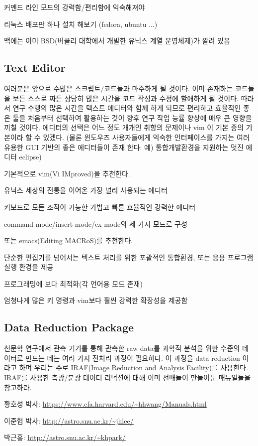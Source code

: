 \begin{packed_item}
\item 커멘드 라인 모드의 강력함/편리함에 익숙해져야
\item 리눅스 배포판 하나 설치 해보기 (fedora, ubuntu ...)
\item 맥에는 이미 BSD(버클리 대학에서 개발한 유닉스 계열 운영체제)가 깔려 있음
\end{packed_item}

\subsection{Text Editor}
여러분은 앞으로 수많은 스크립트/코드들과 마주하게 될 것이다. 이미 존재하는
코드들을 보든 스스로 짜든 상당히 많은 시간을 코드 작성과 수정에 할애하게 될
것이다. 따라서 연구 수행의 많은 시간을 텍스트 에디터와 함께 하게 되므로 편리하고
효율적인 좋은 툴을 처음부터 선택하여 활용하는 것이 향후 연구 작업 능률 향상에
매우 큰 영향을 끼칠 것이다. 에디터의 선택은 어느 정도 개개인 취향의 문제이나 vim
이 기본 중의 기본이라 할 수 있겠다. (물론 윈도우즈 사용자들에게 익숙한
인터페이스를 가지는 여러 유용한 GUI 기반의 좋은 에디터들이 존재 한다: 예)
통합개발환경을 지원하는 멋진 에디터 eclipse)

기본적으로 vim(Vi IMproved)을 추천한다.
\begin{packed_item}
\item 유닉스 세상의 전통을 이어온 가장 널리 사용되는 에디터
\item 키보드로 모든 조작이 가능한 가볍고 빠른 효율적인 강력한 에디터
\item command mode/insert mode/ex mode의 세 가지 모드로 구성
\end{packed_item}

또는 emacs(Editing MACRoS)를 추천한다.
\begin{packed_item}
\item 단순한 편집기를 넘어서는 텍스트 처리를 위한 포괄적인 통합환경, 또는 응용
  프로그램 실행 환경을 제공
\item 프로그래밍에 보다 최적화(각 언어용 모드 존재)
\item 엄청나게 많은 키 명령과 vim보다 훨씬 강력한 확장성을 제공함
\end{packed_item}

\subsection{Data Reduction Package}
천문학 연구에서 관측 기기를 통해 관측한 raw data를 과학적 분석을 위한 수준의
데이터로 만드는 데는 여러 가지 전처리 과정이 필요하다. 이 과정을 data reduction
이라고 하며 우리는 주로 IRAF(Image Reduction and Analysis Facility)를
사용한다. IRAF를 사용한 측광/분광 데이터 리덕션에 대해 이미 선배들이 만들어둔
매뉴얼들을 참고하라.
\begin{packed_item}
\item 황호성 박사: \url{https://www.cfa.harvard.edu/~hhwang/Manuals.html}
\item 이준협 박사: \url{http://astro.snu.ac.kr/~jhlee/}
\item 박근홍: \url{http://astro.snu.ac.kr/~khpark/}
\end{packed_item}

